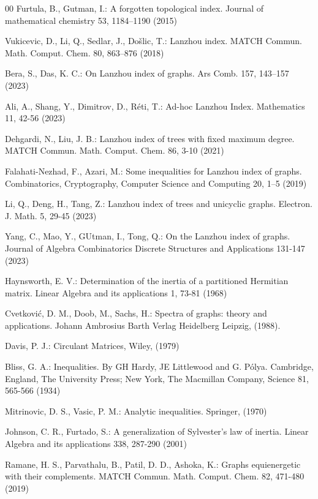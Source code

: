 \documentclass[10pt,a4paper,oneside]{article}
\begin{document}
\begin{thebibliography}{00}
 Furtula,  B., Gutman, I.:  A forgotten topological index. Journal of mathematical chemistry 53, 1184–1190 (2015)

 Vukicevic, D., Li, Q., Sedlar, J., Došlic, T.: Lanzhou index. MATCH Commun. Math. Comput. Chem. 80, 863--876 (2018) 

 Bera, S., Das, K. C.: On Lanzhou index of graphs. Ars Comb. 157, 143–157 (2023)

 Ali, A., Shang, Y., Dimitrov, D.,  Réti, T.:  Ad-hoc Lanzhou Index. Mathematics 11, 42-56 (2023) 


 Dehgardi, N., Liu, J. B.: Lanzhou index of trees with fixed maximum degree. MATCH Commun. Math. Comput. Chem.  86, 3-10  (2021)

 Falahati-Nezhad, F., Azari, M.: Some inequalities for Lanzhou index of graphs. Combinatorics, Cryptography, Computer Science and Computing 20, 1–5 (2019)

 Li, Q., Deng, H., Tang, Z.: Lanzhou index of trees and unicyclic graphs. Electron. J. Math. 5, 29-45 (2023) 

 Yang, C., Mao, Y., GUtman, I., Tong, Q.: On the Lanzhou index of graphs. Journal of Algebra Combinatorics Discrete Structures and Applications 131-147 (2023)

 Haynsworth, E. V.: Determination of the inertia of a partitioned Hermitian matrix. Linear Algebra and its applications 1, 73-81 (1968)


 Cvetković, D. M., Doob, M., Sachs, H.: Spectra of graphs: theory and applications. Johann Ambrosius Barth Verlag  Heidelberg Leipzig, (1988).

Davis, P. J.: Circulant Matrices, Wiley, (1979)

  Bliss, G. A.: Inequalities. By GH Hardy, JE Littlewood and G. Pólya. Cambridge, England, The University Press; New York, The Macmillan Company, Science 81, 565-566 (1934)

Mitrinovic, D. S., Vasic, P. M.:  Analytic inequalities. Springer, (1970) 

  Johnson, C. R., Furtado, S.: A generalization of Sylvester's law of inertia. Linear Algebra and its applications 338,  287-290 (2001) 

 Ramane, H. S., Parvathalu, B., Patil, D. D., Ashoka, K.: Graphs equienergetic with their complements. MATCH Commun. Math. Comput. Chem. 82, 471-480 (2019)


\end{thebibliography}
\end{document}
